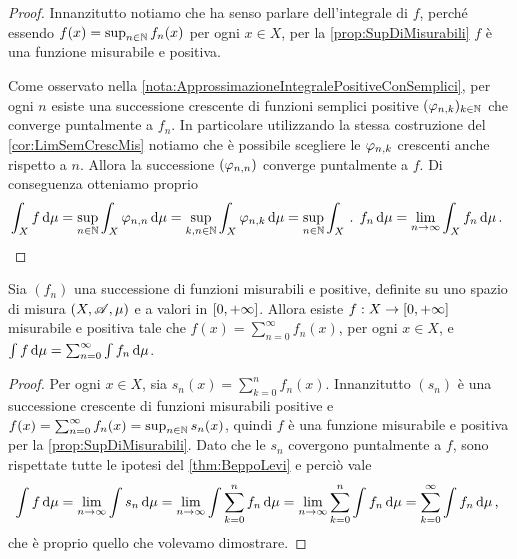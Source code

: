 \begin{proof}
	Innanzitutto notiamo che ha senso parlare dell'integrale di $f$, perché essendo $f(x)=\sup_{n\in\mathbb N}f_n(x)$ per ogni $x\in X$, per la \cref{prop:SupDiMisurabili} $f$ è una funzione misurabile e positiva.
	
	Come osservato nella \cref{nota:ApprossimazioneIntegralePositiveConSemplici}, per ogni $n$ esiste una successione crescente di funzioni semplici positive $(\varphi_{n,k})_{k\in\mathbb N}$ che converge puntalmente a $f_n$. In particolare utilizzando la stessa costruzione del \cref{cor:LimSemCrescMis} notiamo che è possibile scegliere le $\varphi_{n,k}$ crescenti anche rispetto a $n$. Allora la successione $(\varphi_{n,n})$ converge puntalmente a $f$. Di conseguenza otteniamo proprio
	\begin{equation*}
		\int_X f\,\mathrm d\mu=\sup_{n\in\mathbb N}\int_X\varphi_{n,n}\,\mathrm d\mu=\sup_{k,n\in\mathbb N}\int_X \varphi_{n,k}\,\mathrm d\mu=\sup_{n\in\mathbb N}\int_X\, \text{. } f_n\,\mathrm d\mu=\lim_{n\to\infty}\int_Xf_n\,\mathrm d\mu\, \text{. }
	\end{equation*}
\end{proof}

\begin{corollary}\label{cor:IntegrazionePerSeriePositive}
	Sia $(f_n)$ una successione di funzioni misurabili e positive, definite su uno spazio di misura $(X,\mathscr A,\mu)$ e a valori in $[0,+\infty]$. Allora esiste $f:X\to[0,+\infty]$ misurabile e positiva tale che $f(x)=\sum_{n=0}^\infty f_n(x)$, per ogni $x\in X$, e $\int f\,\mathrm d\mu=\sum_{n=0}^\infty\int f_n\,\mathrm d\mu$.
\end{corollary}

\begin{proof}
	Per ogni $x\in X$, sia $s_n(x)=\sum_{k=0}^nf_n(x)$. Innanzitutto $(s_n)$ è una successione crescente di funzioni misurabili positive e $f(x)=\sum_{n=0}^\infty f_n(x)=\sup_{n\in\mathbb N}s_n(x)$, quindi $f$ è una funzione misurabile e positiva per la \cref{prop:SupDiMisurabili}. Dato che le $s_n$ covergono puntalmente a $f$, sono rispettate tutte le ipotesi del \cref{thm:BeppoLevi} e perciò vale
	\begin{equation*}
		\int f \,\mathrm d\mu=\lim_{n\to\infty}\int s_n\,\mathrm d\mu=\lim_{n\to\infty}\int \sum_{k=0}^nf_n\,\mathrm d\mu=\lim_{n\to\infty}\sum_{k=0}^n \int f_n\,\mathrm d\mu=\sum_{k=0}^\infty\int f_n\,\mathrm d\mu\, \text{, }
	\end{equation*}
	che è proprio quello che volevamo dimostrare.
\end{proof}

